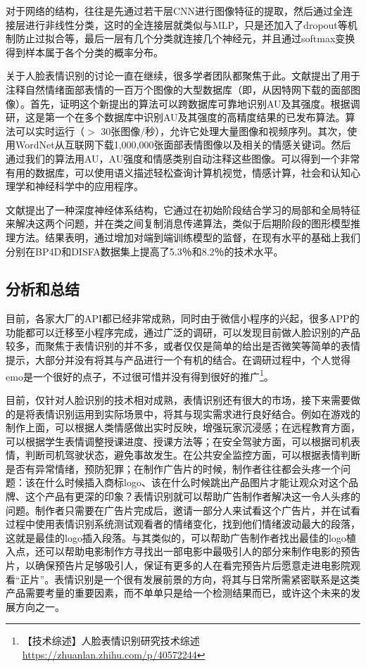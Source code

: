 对于网络的结构，往往是先通过若干层CNN进行图像特征的提取，然后通过全连接层进行非线性分类，这时的全连接层就类似与MLP，只是还加入了dropout等机制防止过拟合等，最后一层有几个分类就连接几个神经元，并且通过softmax变换得到样本属于各个分类的概率分布。

关于人脸表情识别的讨论一直在继续，很多学者团队都聚焦于此。文献\cite{fabian2016emotionet}提出了用于注释自然情绪面部表情的一百万个图像的大型数据库（即，从因特网下载的面部图像）。首先，证明这个新提出的算法可以跨数据库可靠地识别AU及其强度。根据调研，这是第一个在多个数据库中识别AU及其强度的高精度结果的已发布算法。算法可以实时运行（$>$ 30张图像/秒），允许它处理大量图像和视频序列。其次，使用WordNet从互联网下载1,000,000张面部表情图像以及相关的情感关键词。然后通过我们的算法用AU，AU强度和情感类别自动注释这些图像。可以得到一个非常有用的数据库，可以使用语义描述轻松查询计算机视觉，情感计算，社会和认知心理学和神经科学中的应用程序。

文献\cite{fabian2017recognition}提出了一种深度神经体系结构，它通过在初始阶段结合学习的局部和全局特征来解决这两个问题，并在类之间复制消息传递算法，类似于后期阶段的图形模型推理方法。结果表明，通过增加对端到端训练模型的监督，在现有水平的基础上我们分别在BP4D和DISFA数据集上提高了5.3％和8.2％的技术水平。

\subsection{分析和总结}
目前，各家大厂的API都已经非常成熟，同时由于微信小程序的兴起，很多APP的功能都可以迁移至小程序完成，通过广泛的调研，可以发现目前做人脸识别的产品较多，而聚焦于表情识别的并不多，或者仅仅是简单的给出是否微笑等简单的表情提示，大部分并没有将其与产品进行一个有机的结合。在调研过程中，个人觉得emo是一个很好的点子，不过很可惜并没有得到很好的推广\footnote{【技术综述】人脸表情识别研究技术综述 \quad \url{https://zhuanlan.zhihu.com/p/40572244}}。

目前，仅针对人脸识别的技术相对成熟，表情识别还有很大的市场，接下来需要做的是将表情识别运用到实际场景中，将其与现实需求进行良好结合。例如在游戏的制作上面，可以根据人类情感做出实时反映，增强玩家沉浸感；在远程教育方面，可以根据学生表情调整授课进度、授课方法等；在安全驾驶方面，可以根据司机表情，判断司机驾驶状态，避免事故发生。在公共安全监控方面，可以根据表情判断是否有异常情绪，预防犯罪；在制作广告片的时候，制作者往往都会头疼一个问题：该在什么时候插入商标logo、该在什么时候跳出产品图片才能让观众对这个品牌、这个产品有更深的印象？表情识别就可以帮助广告制作者解决这一令人头疼的问题。制作者只需要在广告片完成后，邀请一部分人来试看这个广告片，并在试看过程中使用表情识别系统测试观看者的情绪变化，找到他们情绪波动最大的段落，这就是最佳的logo插入段落。与其类似的，可以帮助广告制作者找出最佳的logo植入点，还可以帮助电影制作方寻找出一部电影中最吸引人的部分来制作电影的预告片，以确保预告片足够吸引人，保证有更多的人在看完预告片后愿意走进电影院观看“正片”。表情识别是一个很有发展前景的方向，将其与日常所需紧密联系是这类产品需要考量的重要因素，而不单单只是给一个检测结果而已，或许这个未来的发展方向之一。

